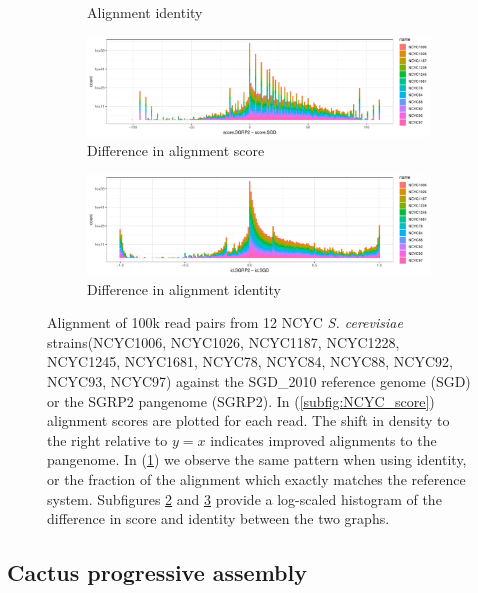 \begin{figure}[htbp!]
\begin{subfigure}[t]{0.49\textwidth}
    \caption{Alignment identity} \label{subfig:NCYC_identity}
  \end{subfigure}
  \begin{subfigure}[t]{1.0\textwidth}
    \includegraphics[width=1.0\textwidth]{Chapter3/Figs/NCYC_SGRP2_SGD_comparison_score_hist_color.pdf}
    \caption{Difference in alignment score} \label{subfig:NCYC_score_diff_hist}
  \end{subfigure}
  \begin{subfigure}[t]{1.0\textwidth}
    \includegraphics[width=1.0\textwidth]{Chapter3/Figs/NCYC_SGRP2_SGD_comparison_id_hist_color.pdf}
    \caption{Difference in alignment identity} \label{subfig:NCYC_id_diff_hist}
  \end{subfigure}
  \caption[Comparing alignment to the linear reference and SGRP2]{
    Alignment of 100k read pairs from 12 NCYC \emph{S. cerevisiae} strains(NCYC1006, NCYC1026, NCYC1187, NCYC1228, NCYC1245, NCYC1681, NCYC78, NCYC84, NCYC88, NCYC92, NCYC93, NCYC97) against the SGD\_2010 reference genome (SGD) or the SGRP2 pangenome (SGRP2).
    In (\ref{subfig:NCYC_score}) alignment scores are plotted for each read.
    The shift in density to the right relative to $y=x$ indicates improved alignments to the pangenome.
    In (\ref{subfig:NCYC_identity}) we observe the same pattern when using identity, or the fraction of the alignment which exactly matches the reference system.
    Subfigures \ref{subfig:NCYC_score_diff_hist} and \ref{subfig:NCYC_id_diff_hist} provide a log-scaled histogram of the difference in score and identity between the two graphs.
  }
\label{fig:NCYC_SGD_SGRP2}
\end{figure}

\subsection{Cactus progressive assembly}
\label{sec:yeast_cactus}

